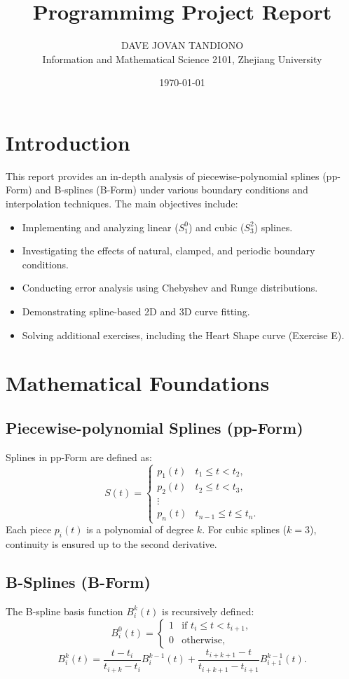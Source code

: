 \documentclass[11pt,a4paper]{article}
\title{Programmimg Project Report}
\author{DAVE JOVAN TANDIONO \\ Information and Mathematical Science 2101, Zhejiang University}
\date{\today}
\begin{document}
\maketitle
\tableofcontents
\newpage

\section{Introduction}
This report provides an in-depth analysis of piecewise-polynomial splines (pp-Form) and B-splines (B-Form) under various boundary conditions and interpolation techniques. The main objectives include:
\begin{itemize}
    \item Implementing and analyzing linear (\(S_1^0\)) and cubic (\(S_3^2\)) splines.
    \item Investigating the effects of natural, clamped, and periodic boundary conditions.
    \item Conducting error analysis using Chebyshev and Runge distributions.
    \item Demonstrating spline-based 2D and 3D curve fitting.
    \item Solving additional exercises, including the Heart Shape curve (Exercise E).
\end{itemize}

\section{Mathematical Foundations}
\subsection{Piecewise-polynomial Splines (pp-Form)}
Splines in pp-Form are defined as:
\[
S(t) = \begin{cases}
p_1(t) & t_1 \leq t < t_2, \\
p_2(t) & t_2 \leq t < t_3, \\
\vdots & \\
p_n(t) & t_{n-1} \leq t \leq t_n.
\end{cases}
\]
Each piece \(p_i(t)\) is a polynomial of degree \(k\). For cubic splines (\(k = 3\)), continuity is ensured up to the second derivative.

\subsection{B-Splines (B-Form)}
The B-spline basis function \(B_i^k(t)\) is recursively defined:
\[
B_i^0(t) =
\begin{cases}
1 & \text{if } t_i \leq t < t_{i+1}, \\
0 & \text{otherwise},
\end{cases}
\]
\[
B_i^k(t) = \frac{t - t_i}{t_{i+k} - t_i} B_i^{k-1}(t) + \frac{t_{i+k+1} - t}{t_{i+k+1} - t_{i+1}} B_{i+1}^{k-1}(t).
\]
\end{document}
